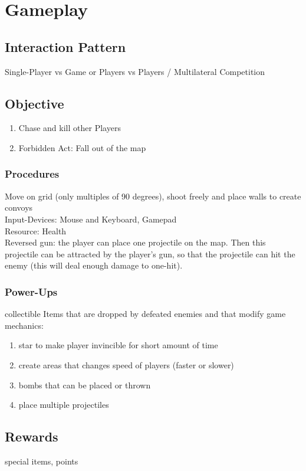 \documentclass[10pt,a4paper]{article}
\begin{document}
\section{Gameplay}
\subsection{Interaction Pattern}
Single-Player vs Game or Players vs Players / Multilateral Competition \\
\subsection{Objective}
\begin{enumerate}
  \item Chase and kill other Players
  \item Forbidden Act: Fall out of the map
\end{enumerate}
\subsubsection{Procedures}
Move on grid (only multiples of 90 degrees), shoot freely and place walls to create convoys\\
Input-Devices: Mouse and Keyboard, Gamepad \\
Resource: Health \\
Reversed gun: the player can place one projectile on the map. Then this projectile can be attracted by the player's gun, so that the projectile can hit the enemy (this will deal enough damage to one-hit).
\subsubsection{Power-Ups}
collectible Items that are dropped by defeated enemies and that modify game mechanics:\\
\begin{enumerate}
	\item star to make player invincible for short amount of time
	\item create areas that changes speed of players (faster or slower)
	\item bombs that can be placed or thrown 
	\item place multiple projectiles
\end{enumerate}
\subsection{Rewards}
special items, points
\end{document}

